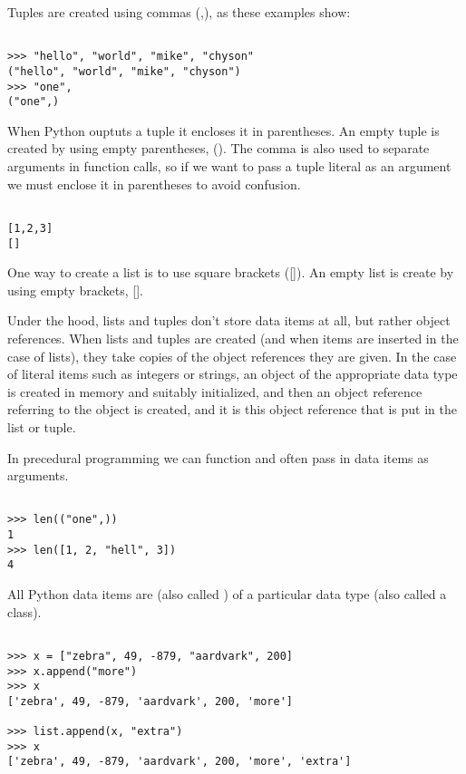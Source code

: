 Tuples are created using commas (,), as these examples show:
\begin{lstlisting}

>>> "hello", "world", "mike", "chyson"
("hello", "world", "mike", "chyson")
>>> "one",
("one",)
\end{lstlisting}


When Python ouptuts a tuple it encloses it in parentheses.
An empty tuple is created by using empty parentheses, ().
The comma is also used to separate arguments in function calls, so if we want to pass a tuple literal as an argument we must enclose it in parentheses to avoid confusion.


\begin{lstlisting}

[1,2,3]
[]
\end{lstlisting}

One way to create a list is to use square brackets ([]).
An empty list is create by using empty brackets, [].


Under the hood, lists and tuples don't store data items at all, but rather object references.
When lists and tuples are created (and when items are inserted in the case of lists), they take copies of the object references they are given.
In the case of literal items such as integers or strings, an object of the appropriate data type is created in memory and suitably initialized, and then an object reference referring to the object is created, and it is this object reference that is put in the list or tuple.



In precedural programming we can function and often pass in data items as arguments.
\begin{lstlisting}

>>> len(("one",))
1
>>> len([1, 2, "hell", 3])
4
\end{lstlisting}



All Python data items are  (also called ) of a particular data type (also called a class).



\begin{lstlisting}

>>> x = ["zebra", 49, -879, "aardvark", 200]
>>> x.append("more")
>>> x
['zebra', 49, -879, 'aardvark', 200, 'more']

>>> list.append(x, "extra")
>>> x
['zebra', 49, -879, 'aardvark', 200, 'more', 'extra']
\end{lstlisting}


